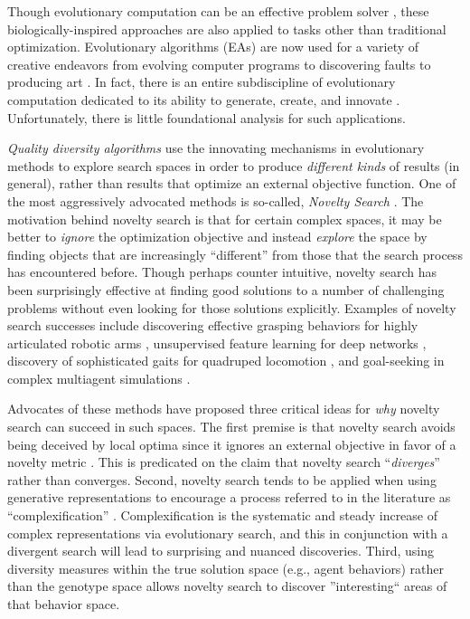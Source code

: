 \documentclass[twoside]{article}
\begin{document}
Though evolutionary computation can be an effective problem solver \citep{ec:DeJong2006,ec:Mitchell97,ec:Michalawicz96,ec:Goldberg89,ec:Holland75}, these biologically-inspired approaches are also applied to tasks other than traditional optimization.  Evolutionary algorithms (EAs) are now used for a variety of creative endeavors from evolving computer programs \citep{ec:LangdonPoli2002,ec:Banzhaf1998,ec:Koza1992} 
 to discovering faults \citep{HanesWiegand2019tor,Mourad2000srds} to producing art \citep{cs:Dreher2014,Secretan2008chi,ec:Romero2007,bio:Dawkins1996}.  In fact, there is an entire subdiscipline of evolutionary computation dedicated to its ability to generate, create, and innovate \citep{ec:Goldberg2002}.  Unfortunately, there is little foundational analysis for such applications.

\emph{Quality diversity algorithms} \citep{FontainEtAl2020icog, Fontaine2021corr, Choi2021gecco} use the innovating mechanisms in evolutionary methods to explore search spaces in order to produce \emph{different kinds} of results (in general), rather than results that optimize an external objective function.  One of the most aggressively advocated methods is so-called, \emph{Novelty Search} \citep{StanleyLehman2015,Lehman2013gecco,LehmanStanley2011cec,LehmanStanley2008ssls}.  The motivation behind novelty search is that for certain complex spaces, it may be better to \emph{ignore} the optimization objective and instead \emph{explore} the space by finding objects that are increasingly ``different'' from those that the search process has encountered before.  Though perhaps counter intuitive, novelty search has been surprisingly effective at finding good solutions to a number of challenging problems without even looking for those solutions explicitly.  Examples of novelty search successes include discovering effective grasping behaviors for highly articulated robotic arms \citep{Huang2014cica}, unsupervised feature learning for deep networks \citep{Szerlip2015cai}, discovery of sophisticated gaits for quadruped locomotion \citep{Morse2013acgec}, and goal-seeking in complex multiagent simulations \citep{Lehman2011ecj}.

Advocates of these methods have proposed three critical ideas for \emph{why} novelty search can succeed in such spaces.  The first premise is that novelty search avoids being deceived by local optima since it ignores an external objective in favor of a novelty metric \citep{Lehman2011ecj}.  This is predicated on the claim that novelty search ``\emph{diverges}'' rather than converges.  Second, novelty search tends to be applied when using generative representations \citep{LehmanStanley2008ssls} to encourage a process referred to in the literature as ``complexification'' \citep{StanleyMiikkulainen2004jair}.  Complexification is the systematic and steady increase of complex representations via evolutionary search, and this in conjunction with a divergent search will lead to surprising and nuanced discoveries.  Third, using diversity measures within the true solution space (e.g., agent behaviors) rather than the genotype space allows novelty search to discover ''interesting`` areas of that behavior space.  
\end{document}
